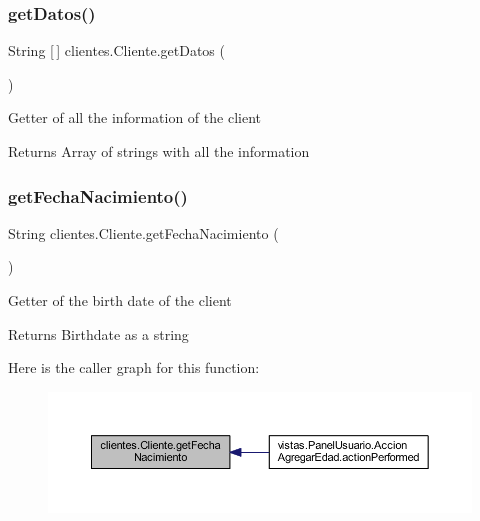 \subsubsection{\texorpdfstring{get\+Datos()}{getDatos()}}
{\footnotesize\ttfamily String \mbox{[}$\,$\mbox{]} clientes.\+Cliente.\+get\+Datos (\begin{DoxyParamCaption}{ }\end{DoxyParamCaption})}

Getter of all the information of the client

\begin{DoxyReturn}{Returns}
Array of strings with all the information 
\end{DoxyReturn}
\mbox{\label{classclientes_1_1_cliente_a81caceaa663e94f828969a0ecfb63730}} 
\subsubsection{\texorpdfstring{get\+Fecha\+Nacimiento()}{getFechaNacimiento()}}
{\footnotesize\ttfamily String clientes.\+Cliente.\+get\+Fecha\+Nacimiento (\begin{DoxyParamCaption}{ }\end{DoxyParamCaption})}

Getter of the birth date of the client

\begin{DoxyReturn}{Returns}
Birthdate as a string 
\end{DoxyReturn}
Here is the caller graph for this function\+:\nopagebreak
\begin{figure}[H]
\begin{center}
\leavevmode
\includegraphics[width=350pt]{classclientes_1_1_cliente_a81caceaa663e94f828969a0ecfb63730_icgraph}
\end{center}
\end{figure}
\mbox{\label{classclientes_1_1_cliente_a7ec404ddfce7ca5c70e85f005988edc3}} 
